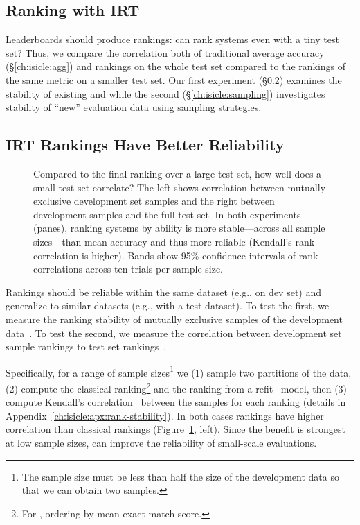 \subsection{Ranking with IRT}

Leaderboards should produce  \subj{} rankings: can
\name{} rank systems even with a tiny test set?
Thus, we compare the correlation both of traditional average accuracy
(\S\ref{ch:isicle:agg}) and \irt{} rankings on the whole test
set compared to the rankings of the same metric on a smaller test set.
Our first experiment (\S\ref{ch:isicle:stable}) examines the stability
of existing \itms{} and \subjs{} while the second
(\S\ref{ch:isicle:sampling}) investigates stability of ``new''
evaluation data using sampling strategies.

\subsection{IRT Rankings Have Better Reliability}
\label{ch:isicle:stable}

\begin{figure}[t]
    \centering
    \caption{
        Compared to the final ranking over a large test set, how well does a small test set correlate?
                The left shows correlation between mutually exclusive development set samples and the right between development samples and the full test set.
                In both experiments (panes), ranking systems by \irt{} ability is more stable---across all sample sizes---than mean accuracy and thus more reliable (Kendall's rank correlation is higher).
                Bands show 95\% confidence intervals of rank correlations across ten trials per sample size.
    }
    \label{fig:stability}
\end{figure}

Rankings should be reliable within the same dataset (e.g., on dev
set) and generalize to similar datasets (e.g., with a test dataset).
To test the first, we measure the ranking stability of mutually
exclusive samples of the development
data~\cite{buckley2000measure}.
To test the second, we measure the correlation between
development set sample rankings to test set rankings~\citep{voorhees1998var}.

Specifically, for a range of sample sizes\footnote{ The sample size
    must be less than half the size of the development data so that we
    can obtain two samples.  } we (1) sample two partitions of the data,
(2) compute the classical ranking\footnote{For \squad{}, ordering by
    mean exact match score.} and the \irt{} ranking from a refit
~model, then (3) compute Kendall's
correlation~\citep{kendall1938tau} between the samples for each
ranking (details in Appendix~\ref{ch:isicle:apx:rank-stability}).
In both cases \irt{} rankings have higher correlation than classical
rankings (Figure~\ref{fig:stability}, left).
Since the benefit is strongest at low sample sizes, \irt{} can improve
the reliability of small-scale evaluations.

